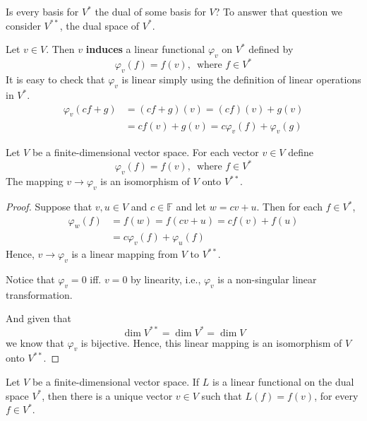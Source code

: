Is every basis for $V^\ast$ the dual of some basis for $V$? To answer that question we consider $V^{\ast \ast}$, the dual space of $V^\ast$.
	
Let $v \in V$. Then $v$ \textbf{induces} a linear functional $\varphi_v$ on $V^\ast$ defined by
\[
	\varphi_v (f) = f(v), \, \text{ where } f \in V^\ast
\]
It is easy to check that $\varphi_v$ is linear simply using the definition of linear operations in $V^\ast$.
\begin{equation*}
	\begin{aligned}
		\varphi_v (cf + g) &= (cf+g)(v) = (cf)(v) + g(v) \\
					&= cf(v) + g(v) = c\varphi_v (f) + \varphi_v (g)
	\end{aligned}
\end{equation*}

\begin{theorem}
	Let $V$ be a finite-dimensional vector space. For each vector $v \in V$ define
	\[
		\varphi_v (f) = f(v), \, \text{ where } f \in V^\ast
	\]
	The mapping $v \longrightarrow \varphi_v$ is an isomorphism of $V$ onto $V^{\ast \ast}$.
\end{theorem}

\begin{proof}
	Suppose that $v, u \in V$ and $c \in \mathbb{F}$ and let $w = cv + u$. Then for each $f \in V^\ast$,
	\begin{equation*}
		\begin{aligned}
			\varphi_w (f) &= f(w) = f(cv + u) = cf(v) + f(u) \\
				   &= c\varphi_v (f) + \varphi_u (f)
		\end{aligned}
	\end{equation*}
	Hence, $v \longrightarrow \varphi_v$ is a linear mapping from $V$ to $V^{\ast \ast}$.

	Notice that $\varphi_v = 0$ iff. $v = 0$ by linearity, i.e., $\varphi_v$ is a non-singular linear transformation.

	And given that 
	\[
		\dim V^{\ast \ast} = \dim V^\ast = \dim V
	\]
	we know that $\varphi_v$ is bijective. Hence, this linear mapping is an isomorphism of $V$ onto $V^{\ast \ast}$.
\end{proof}

\begin{corollary}
	Let $V$ be a finite-dimensional vector space. If $L$ is a linear functional on the dual space $V^\ast$, then there is a unique vector $v \in V$ such that $L(f) = f(v)$, for every $f \in V^\ast$.
\end{corollary}

